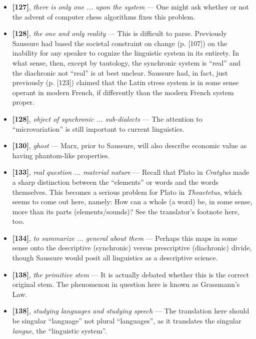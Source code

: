\documentclass[12pt]{article}
\begin{document}
\begin{itemize}
\item \textbf{[127]}, \textit{there is only one ... upon the system} --- One might ask whether or not the advent of computer chess algorithms fixes this problem.

\item \textbf{[128]}, \textit{the one and only reality} --- This is difficult to parse. Previously Saussure had based the societal constraint on change (p. [107]) on the inability for any speaker to cognize the linguistic system in its entirety. In what sense, then, except by tautology, the synchronic system is ``real'' and the diachronic not ``real'' is at best unclear. Saussure had, in fact, just previously (p. [123]) claimed that the Latin stress system is in some sense operant in modern French, if differently than the modern French system proper.

\item \textbf{[128]}, \textit{object of synchronic ... sub-dialects} --- The attention to ``microvariation'' is still important to current linguistics.

\item \textbf{[130]}, \textit{ghost} --- Marx, prior to Saussure, will also describe economic value as having phantom-like properties.

\item \textbf{[133]}, \textit{real question ... material nature} --- Recall that Plato in \textit{Cratylus} made a sharp distinction between the ``elements'' or words and the words themselves. This becomes a serious problem for Plato in \textit{Theaetetus}, which seems to come out here, namely: How can a whole (a word) be, in some sense, more than its parts (elements/sounds)? See the translator's footnote here, too.

\item \textbf{[134]}, \textit{to summarize ... general about them} --- Perhaps this maps in some sense onto the descriptive (synchronic) versus prescriptive (diachronic) divide, though Saussure would posit all linguistics as a descriptive science.

\item \textbf{[138]}, \textit{the primitive stem} --- It is actually debated whether this is the correct original stem. The phenomenon in question here is known as Grassmann's Law.

\item \textbf{[138]}, \textit{studying languages and studying speech} --- The translation here should be singular ``language'' not plural ``languages'', as it translates the singular \textit{langue}, the ``linguistic system''.


\end{itemize}
\end{document}
